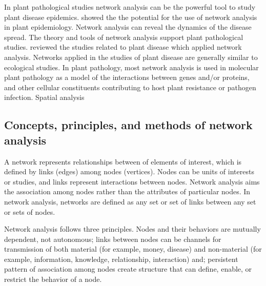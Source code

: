 In plant pathological studies network analysis can be the powerful tool to study plant disease epidemics.  showed the  the potential for the use of network analysis in plant epidemiology. Network analysis can reveal the dynamics of the disease spread. The theory and tools of network analysis support plant pathological studies.  reviewed the studies related to plant disease which applied network analysis. Networks applied in the studies of plant disease are generally similar to ecological studies. In plant pathology, most network analysis is used in molecular plant pathology as a model of the interactions between genes and/or proteins, and other cellular constituents contributing to host plant resistance or pathogen infection. Spatial analysis 


\subsection*{Concepts, principles, and methods of network analysis}

A network represents relationships between of elements of interest, which is defined by links (edges) among nodes (vertices). Nodes can be units of interests or studies, and links represent interactions between nodes. Network analysis aims the association among nodes rather than the attributes of particular nodes. In network analysis, networks are defined as any set or set of links between any set or sets of nodes.

Network analysis follows three principles. Nodes and their behaviors are mutually dependent, not autonomous; links between nodes can be channels for transmission of both material (for example, money, disease) and non-material (for example, information, knowledge, relationship, interaction) and; persistent pattern of association among nodes create structure that can define, enable, or restrict the behavior of a node.  


